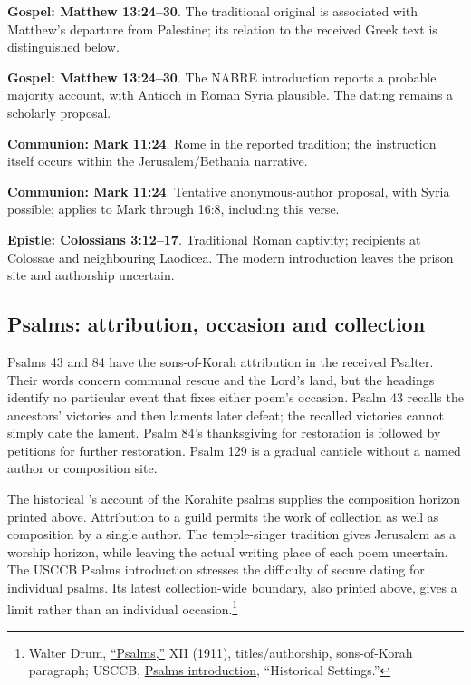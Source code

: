 \noindent\textbf{Gospel: Matthew 13:24--30}. The traditional original is associated with Matthew's departure from Palestine; its relation to the received Greek text is distinguished below.

\noindent\textbf{Gospel: Matthew 13:24--30}. The NABRE introduction reports a probable majority account, with Antioch in Roman Syria plausible. The dating remains a scholarly proposal.

\noindent\textbf{Communion: Mark 11:24}. Rome in the reported tradition; the instruction itself occurs within the Jerusalem/Bethania narrative.

\noindent\textbf{Communion: Mark 11:24}. Tentative anonymous-author proposal, with Syria possible; applies to Mark through 16:8, including this verse.

\noindent\textbf{Epistle: Colossians 3:12--17}. Traditional Roman captivity; recipients at Colossae and neighbouring Laodicea. The modern introduction leaves the prison site and authorship uncertain.


\subsection{Psalms: attribution, occasion and collection}
\label{hist-psalms}
Psalms 43 and 84 have the sons-of-Korah attribution in the received
Psalter. Their words concern communal rescue and the Lord's land,
but the headings identify no particular event that fixes either poem's
occasion. Psalm 43 recalls the ancestors' victories and then laments
later defeat; the recalled victories cannot simply date the lament.
Psalm 84's thanksgiving for restoration is followed by petitions for
further restoration. Psalm 129 is a gradual canticle without a named
author or composition site.

The historical 's account of the Korahite
psalms supplies the composition horizon printed above. Attribution to
a guild permits the work of collection as well as composition by a
single author. The temple-singer tradition gives Jerusalem as a worship
horizon, while leaving the actual writing place of each poem uncertain.
The USCCB Psalms introduction stresses the difficulty of secure dating
for individual psalms. Its latest collection-wide boundary, also printed
above, gives a limit rather than an individual occasion.\footnote{Walter
Drum, \href{https://www.newadvent.org/cathen/12533a.htm}{``Psalms,''}
 XII (1911), titles/authorship, sons-of-Korah
paragraph; USCCB, \href{https://bible.usccb.org/bible/psalms/0}{Psalms
introduction}, ``Historical Settings.''}

